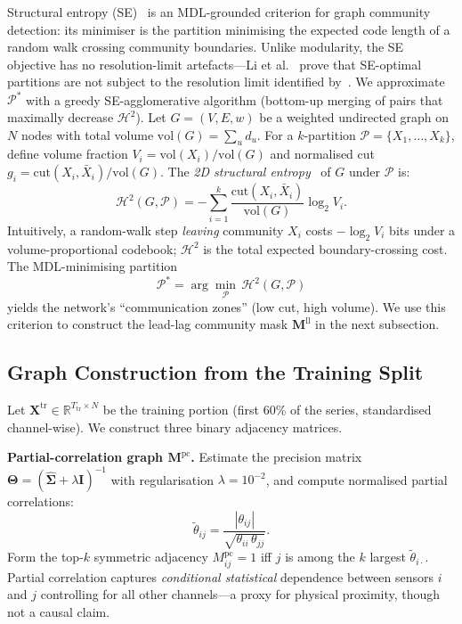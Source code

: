 \documentclass[letterpaper]{article}   %
\begin{document}
Structural entropy (SE)~\cite{li2016structural,li2024book} is an MDL-grounded criterion for
graph community detection: its minimiser is the partition minimising the expected code length
of a random walk crossing community boundaries.
Unlike modularity, the SE objective has no resolution-limit artefacts---Li et al.~\cite{li2016structural}
prove that SE-optimal partitions are not subject to the resolution limit identified by~\cite{fortunato2007resolution}.
We approximate $\mathcal{P}^*$ with a greedy SE-agglomerative algorithm (bottom-up merging of pairs that maximally decrease $\mathcal{H}^2$).
Let $G{=}(V,E,w)$ be a weighted undirected graph on $N$ nodes with total volume
$\mathrm{vol}(G){=}\sum_u d_u$.
For a $k$-partition $\mathcal{P}{=}\{X_1,\ldots,X_k\}$, define volume fraction
$V_i{=}\mathrm{vol}(X_i)/\mathrm{vol}(G)$ and normalised cut $g_i{=}\mathrm{cut}(X_i,\bar{X}_i)/\mathrm{vol}(G)$.
The \emph{2D structural entropy}~\cite{li2016structural} of $G$ under $\mathcal{P}$ is:
\begin{equation}
  \label{eq:se2d}
  \mathcal{H}^2(G,\mathcal{P}) = -\sum_{i=1}^{k}
    \frac{\mathrm{cut}(X_i,\bar{X}_i)}{\mathrm{vol}(G)}
    \log_2 V_i.
\end{equation}
Intuitively, a random-walk step \emph{leaving} community $X_i$ costs $-\log_2 V_i$ bits
under a volume-proportional codebook; $\mathcal{H}^2$ is the total expected boundary-crossing cost.
The MDL-minimising partition
\begin{equation}
  \label{eq:se2d-opt}
  \mathcal{P}^* = \arg\min_{\mathcal{P}}\,\mathcal{H}^2(G,\mathcal{P})
\end{equation}
yields the network's ``communication zones'' (low cut, high volume).
We use this criterion to construct the lead-lag community mask $\mathbf{M}^{\text{ll}}$
in the next subsection.

\subsection{Graph Construction from the Training Split}
\label{sec:graphconstruction}

Let $\mathbf{X}^{\text{tr}}\in\mathbb{R}^{T_{\text{tr}}\times N}$ be the training
portion (first 60\% of the series, standardised channel-wise).
We construct three binary adjacency matrices.

\textbf{Partial-correlation graph $\mathbf{M}^{\text{pc}}$.}
Estimate the precision matrix
$\boldsymbol{\Theta}=(\hat{\boldsymbol{\Sigma}}+\lambda\mathbf{I})^{-1}$
with regularisation $\lambda{=}10^{-2}$, and compute normalised partial correlations:
\begin{equation}
\tilde{\theta}_{ij} = \frac{|\theta_{ij}|}{\sqrt{\theta_{ii}\,\theta_{jj}}}.
\end{equation}
Form the top-$k$ symmetric adjacency
$M^{\text{pc}}_{ij}{=}1$ iff $j$ is among the $k$ largest $\tilde{\theta}_{i\cdot}$.
Partial correlation captures \emph{conditional statistical} dependence between sensors $i$ and $j$
controlling for all other channels—a proxy for physical proximity, though not a causal claim.
\end{document}
